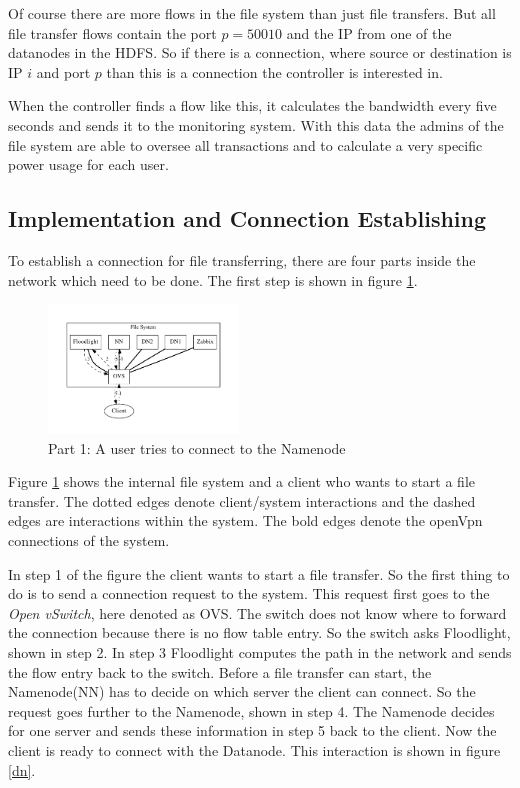  Of course there are more flows in the file system than just file transfers. But all file transfer flows contain the port $p=50010$ and the IP from one of the datanodes in the HDFS. So if there is a connection, where source or destination is IP $i$ and port $p$ than this is a connection the controller is interested in.
 
 When the controller finds a flow like this, it calculates the bandwidth every five seconds and sends it to the monitoring system. With this data the admins of the file system are able to oversee all transactions and to calculate a very specific power usage for each user. 
 
 \subsection{Implementation and Connection Establishing}               

To establish a connection for file transferring, there are four parts inside the network which need to be done. The first step is shown in figure \ref{nn}.
 
\begin{figure}[htp]
\centering
\includegraphics[width=0.45\textwidth]{img/connectionToNamenode} 
\caption{Part 1: A user tries to connect to the Namenode}
\label{nn}
\end{figure}

Figure \ref{nn} shows the internal file system and a client who wants to start a file transfer. The dotted edges denote client/system interactions and the dashed edges are interactions within the system. The bold edges denote the openVpn connections of the system.

In step 1 of the figure the client wants to start a file transfer. So the first thing to do is to send a connection request to the system. This request first goes to the \textit{Open vSwitch}, here denoted as OVS. The switch does not know where to forward the connection because there is no flow table entry. So the switch asks Floodlight, shown in step 2. In step 3 Floodlight computes the path in the network and sends the flow entry back to the switch. Before a file transfer can start, the Namenode(NN) has to decide on which server the client can connect. So the request goes further to the Namenode, shown in step 4. The Namenode decides for one server and sends these information in step 5 back to the client. Now the client is ready to connect with the Datanode. This interaction is shown in figure \ref{dn}.

